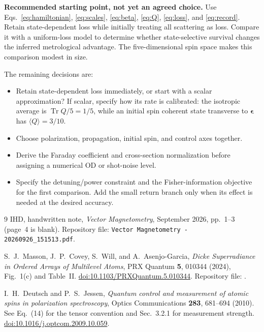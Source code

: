 \documentclass[11pt,letterpaper]{article}
\newcommand{\Tr}{\operatorname{Tr}}
\begin{document}
\textbf{Recommended starting point, not yet an agreed choice.}
Use Eqs.~\eqref{eq:hamiltonian}, \eqref{eq:scales}, \eqref{eq:beta},
\eqref{eq:Q}, \eqref{eq:loss}, and \eqref{eq:record}. Retain state-dependent
loss while initially treating all scattering as loss. Compare it with a
uniform-loss model to determine whether state-selective survival changes the
inferred metrological advantage. The five-dimensional spin space makes this
comparison modest in size.

The remaining decisions are:
\begin{itemize}
\item Retain state-dependent loss immediately, or start with a scalar
approximation? If scalar, specify how its rate is calibrated: the isotropic
average is $\Tr Q/5=1/5$, while an initial spin coherent state transverse to
$\boldsymbol\epsilon$ has $\langle Q\rangle=3/10$.
\item Choose polarization, propagation, initial spin, and control axes together.
\item Derive the Faraday coefficient and cross-section normalization before
assigning a numerical OD or shot-noise level.
\item Specify the detuning/power constraint and the Fisher-information objective
for the first comparison. Add the small return branch only when its effect is
needed at the desired accuracy.
\end{itemize}

\begin{thebibliography}{9}
\small
{}
IHD, handwritten note, \emph{Vector Magnetometry}, September 2026,
pp.~1--3 (page~4 is blank).
Repository file: \texttt{Vector Magnetometry - 20260926\_151513.pdf}.

S.~J.~Masson, J.~P.~Covey, S.~Will, and A.~Asenjo-Garcia,
\emph{Dicke Superradiance in Ordered Arrays of Multilevel Atoms},
PRX Quantum \textbf{5}, 010344 (2024), Fig.~1(c) and Table~II.
\href{https://doi.org/10.1103/PRXQuantum.5.010344}{doi:10.1103/PRXQuantum.5.010344}.
Repository file: .

I.~H.~Deutsch and P.~S.~Jessen,
\emph{Quantum control and measurement of atomic spins in polarization
spectroscopy}, Optics Communications \textbf{283}, 681--694 (2010).
See Eq.~(14) for the tensor convention and Sec.~3.2.1 for measurement strength.
\href{https://doi.org/10.1016/j.optcom.2009.10.059}{doi:10.1016/j.optcom.2009.10.059}.
\end{thebibliography}
\end{document}

